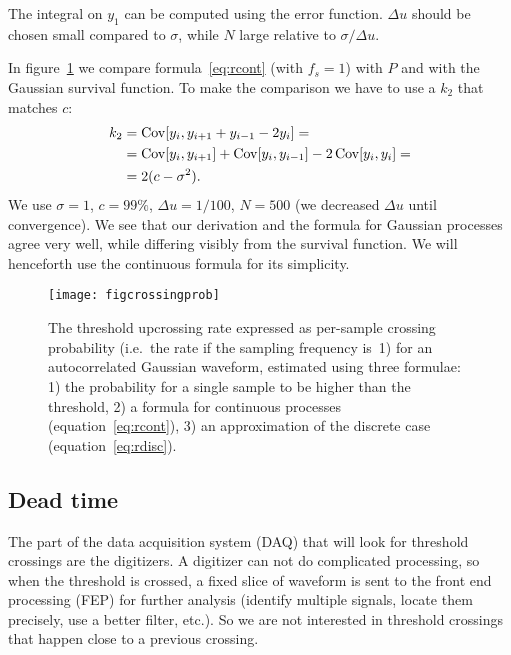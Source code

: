 The integral on $y_1$ can be computed using the error function. $\Delta u$
should be chosen small compared to $\sigma$, while $N$ large relative to
$\sigma / \Delta u$.

In figure~\ref{fig:crossingprob} we compare formula~\eqref{eq:rcont} (with $f_s
= 1$) with $P$ and with the Gaussian survival function. To make the comparison
we have to use a $k_2$ that matches $c$:
%
\begin{align}
    k_2 &= \operatorname{Cov}[y_i, y_{i+1}+y_{i-1}-2y_i] = \notag \\
    &= \operatorname{Cov}[y_i,y_{i+1}]
    + \operatorname{Cov}[y_i,y_{i-1}]
    - 2 \operatorname{Cov}[y_i,y_i] = \notag \\
    &= 2 (c - \sigma^2). \label{eq:c2k2}
\end{align}
%
We use $\sigma=1$, $c = \SI{99}\%$, $\Delta u = 1/100$, $N=500$ (we decreased
$\Delta u$ until convergence). We see that our derivation and the formula
for Gaussian processes agree very well, while differing visibly from the
survival function. We will henceforth use the continuous formula for its
simplicity.

\begin{figure}
    \hspace{0.00\textwidth}
    \texttt{[image: figcrossingprob]}

    \caption{\label{fig:crossingprob} The threshold upcrossing rate expressed
    as per-sample crossing probability (i.e.\ the rate if the sampling
    frequency is~1) for an autocorrelated Gaussian waveform, estimated using
    three formulae: 1) the probability for a single sample to be higher than
    the threshold, 2) a formula for continuous processes
    (equation~\ref{eq:rcont}), 3) an approximation of the discrete case
    (equation~\ref{eq:rdisc}).}
    
\end{figure}

\subsection{Dead time}

The part of the data acquisition system (DAQ) that will look for threshold
crossings are the digitizers. A digitizer can not do complicated processing, so
when the threshold is crossed, a fixed slice of waveform is sent to the front
end processing (FEP) for further analysis (identify multiple signals, locate
them precisely, use a better filter, etc.). So we are not interested in
threshold crossings that happen close to a previous crossing.

